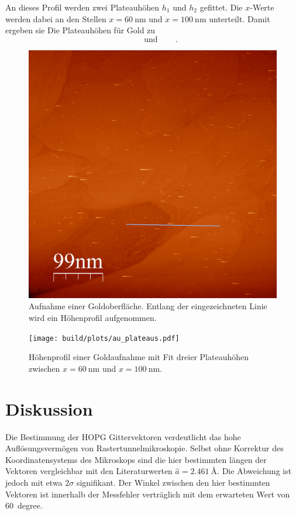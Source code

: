 An dieses Profil werden zwei Plateauhöhen $h_1$ und $h_2$ gefittet. Die
$x$-Werte werden dabei an den Stellen $x = \SI{60}{\nano\meter}$ und $x =
\SI{100}{\nano\meter}$ unterteilt.  Damit ergeben sie Die Plateauhöhen für Gold
zu
\begin{equation*}
    \qquad\text{und}\qquad\,.
\end{equation*}
\begin{figure}
    \centering
    \includegraphics[width=0.9\linewidth]{raw/AU-1-View-2.png}
    \caption{
        Aufnahme einer Goldoberfläche. Entlang der eingezeichneten Linie
    wird ein Höhenprofil aufgenommen.
    }
    \label{fig:gold}
\end{figure}
\begin{figure}
    \centering
    \texttt{[image: build/plots/au\_plateaus.pdf]}
    \caption{
        Höhenprofil einer Goldaufnahme mit Fit dreier Plateauhöhen zwischen $x
        = \SI{60}{\nano\meter}$ und $x = \SI{100}{\nano\meter}$.
    }
    \label{fig:gold-fit}
\end{figure}

\section{Diskussion}
\label{sec:diskussion}
Die Bestimmung der HOPG Gittervektoren verdeutlicht das hohe
Auflösungsvermögen von Rastertunnelmikroskopie. Selbst ohne Korrektur des
Koordinatensystems des Mikroskops sind die hier bestimmten längen der Vektoren
vergleichbar mit den Literaturwerten $\hat{a} = \SI{2.461}{\angstrom}$. Die
Abweichung ist jedoch mit etwa $2\sigma$ signifikant. Der Winkel zwischen den
hier bestimmten Vektoren ist innerhalb der
Messfehler verträglich mit dem erwarteten Wert von \SI{60}{degree}.

